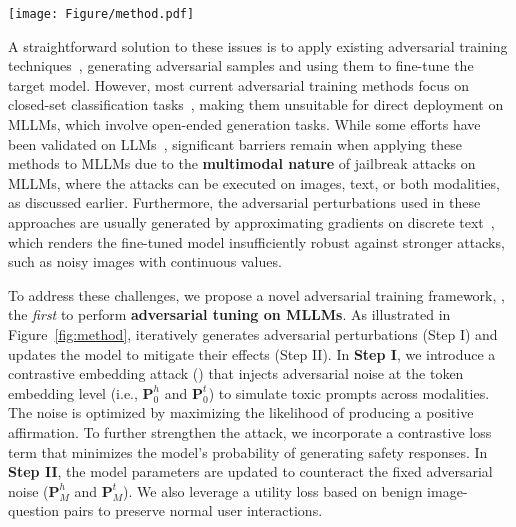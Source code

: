 \begin{figure*}[t]  %
    \centering
   \texttt{[image: Figure/method.pdf]}  %
   \vspace{-0.25in}
    \caption{Overview of the proposed {\name}, which contains two iterative steps. In Step I, we fix the parameters of the MLLM. {\name} optimizes two noise matrices initialized by $\mathbf{P}^h_0$ and $\mathbf{P}^t_0$ with $M$ steps. 
    Step II aims to update the parameters of MLLMs by fixing the learned $\mathbf{P}^h_M$ and $\mathbf{P}^t_M$ when calculating the defense loss $L_{\rm def}$. To guarantee the utility of the fined-tuned MLLM, we also introduce a utility loss $L_{\rm utility}$. The updated model parameters are then used in Step I again.}
    \label{fig:method}
    \vspace{-0.2in}
\end{figure*}

A straightforward solution to these issues is to apply existing adversarial training techniques~\citep{bai2021recent}, generating adversarial samples and using them to fine-tune the target model. However, most current adversarial training methods focus on closed-set classification tasks~\citep{DBLP:conf/iclr/MadryMSTV18,shafahi2020universal}, making them unsuitable for direct deployment on MLLMs, which involve open-ended generation tasks.
While some efforts have been validated on LLMs~\citep{mazeika2024harmbench,xhonneux2024efficient,DBLP:journals/corr/abs-2406-06622}, 
significant barriers remain when applying these methods to MLLMs due to the \textbf{multimodal nature} of jailbreak attacks on MLLMs, where the attacks can be executed on images, text, or both modalities, as discussed earlier. Furthermore, the adversarial perturbations used in these approaches are usually generated by approximating gradients on discrete text~\citep{mazeika2024harmbench,DBLP:journals/corr/abs-2406-06622}, which renders the fine-tuned model insufficiently robust against stronger attacks, such as noisy images with continuous values.

To address these challenges, we propose a novel adversarial training framework, {\name}, the \textit{first} to perform \textbf{adversarial tuning on MLLMs}. As illustrated in Figure~\ref{fig:method}, {\name} iteratively generates adversarial perturbations (Step I) and updates the model to mitigate their effects (Step II).
In \textbf{Step I}, we introduce a contrastive embedding attack ({\attack}) that injects adversarial noise at the token embedding level (i.e., $\mathbf{P}^h_0$ and $\mathbf{P}^t_0$) to simulate toxic prompts across modalities. The noise is optimized by maximizing the likelihood of producing a positive affirmation. To further strengthen the attack, we incorporate a contrastive loss term that minimizes the model's probability of generating safety responses.
In \textbf{Step II}, the model parameters are updated to counteract the fixed adversarial noise ($\mathbf{P}^h_M$ and $\mathbf{P}^t_M$). We also leverage a utility loss based on benign image-question pairs to preserve normal user interactions. 

